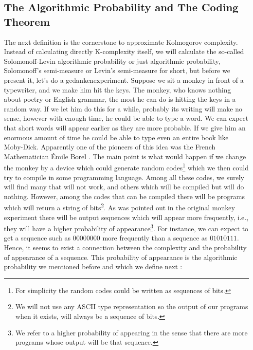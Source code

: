 \subsection{The Algorithmic Probability and The Coding Theorem}
The next definition is the cornerstone to approximate Kolmogorov complexity. Instead of calculating directly K-complexity itself, we will calculate the so-called Solomonoff-Levin algorithmic probability or just algorithmic probability, Solomonoff's semi-measure or Levin's semi-measure for short, but before we present it, let's do a gedankenexperiment. Suppose we sit a monkey in front of a typewriter, and we make him hit the keys. The monkey, who knows nothing about poetry or English grammar, the most he can do is hitting the keys in a random way. If we let him do this for a while, probably its writing will make no sense, however with enough time, he could be able to type a word. We can expect that short words will appear earlier as they are more probable. If we give him an enormous amount of time he could be able to type even an entire book like Moby-Dick. Apparently one of the pioneers of this idea was the French Mathematician Émile Borel \cite{monkey}. The main point is what would happen if we change the monkey by a device which could generate random codes\footnote{For simplicity the random codes could be written as sequences of bits.} which we then could try to compile in some programming language. Among all these codes, we surely will find many that will not work, and others which will be compiled but will do nothing. However, among the codes that can be compiled there will be programs which will return a string of bits\footnote{We will not use any ASCII type representation so the output of our programs when it exists, will always be a sequence of bits.}. As was pointed out in the original monkey experiment there will be output sequences which will appear more frequently, i.e., they will have a higher probability of appearance\footnote{We refer to a higher probability of appearing in the sense that there are more programs whose output will be that sequence.}. For instance, we can expect to get a sequence such as $00000000$ more frequently than a sequence as $01010111$. Hence, it seems to exist a connection between the complexity and the probability of appearance of a sequence. This probability of appearance is the algorithmic probability we mentioned before and which we define next \cite{kolmo_book}\cite{kolmo_calculating}:

